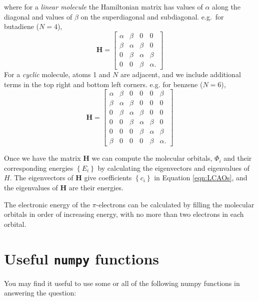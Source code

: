 \documentclass[a4paper]{article}
\newcommand{\bvec}[1]{\boldsymbol{\mathbf{#1}}}
\begin{document}
where for a \emph{linear molecule} the Hamiltonian matrix has values of $\alpha$ along the diagonal and values of $\beta$ on the superdiagonal and subdiagonal. e.g.\ for butadiene ($N=4$),
\begin{equation}
\bvec{H} = \begin{bmatrix}
\alpha & \beta  & 0      & 0 \\
\beta  & \alpha & \beta  & 0 \\
0      & \beta  & \alpha & \beta \\
0      & 0      & \beta  & \alpha.
\end{bmatrix}
\end{equation}
For a \emph{cyclic} molecule, atoms 1 and $N$ are adjacent, and we include additional terms in the top right and bottom left corners. e.g. for benzene ($N=6$),
\begin{equation}
\bvec{H} = \begin{bmatrix}
\alpha & \beta  & 0      & 0      & 0      & \beta \\
\beta  & \alpha & \beta  & 0      & 0      & 0     \\
0      & \beta  & \alpha & \beta  & 0      & 0     \\
0      & 0      & \beta  & \alpha & \beta  & 0     \\
0      & 0      & 0      & \beta  & \alpha & \beta \\
\beta  & 0      & 0      & 0      & \beta  & \alpha.
\end{bmatrix}
\end{equation}

Once we have the matrix $\bvec{H}$ we can compute the molecular orbitals, $\Phi_i$ and their corresponding energies $\left\{E_i\right\}$ by calculating the eigenvectors and eigenvalues of $H$. The eigenvectors of $\bvec{H}$ give coefficients $\left\{c_i\right\}$ in Equation \ref{eqn:LCAOs}, and the eigenvalues of $\bvec{H}$ are their energies.

The electronic energy of the $\pi$-electrons can be calculated by filling the molecular orbitals in order of increasing energy, with no more than two electrons in each orbital.

\pagebreak

\section{Useful \texttt{numpy} functions}
You may find it useful to use some or all of the following numpy functions in answering the question:
\end{document}
